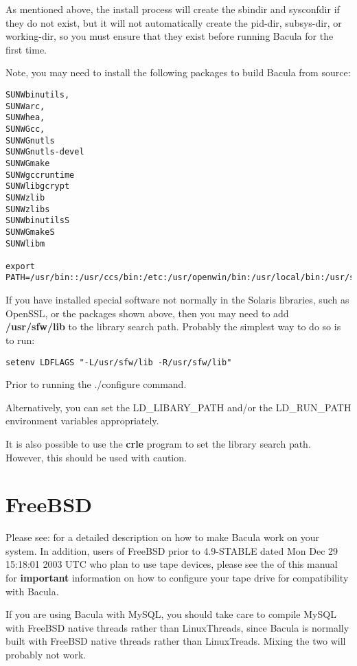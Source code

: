 As mentioned above, the install process will create the sbindir and sysconfdir
if they do not exist, but it will not automatically create the pid-dir,
subsys-dir, or working-dir, so you must ensure that they exist before running
Bacula for the first time.

Note, you may need to install the following packages to build Bacula
from source:
\footnotesize
\begin{verbatim}
SUNWbinutils,
SUNWarc,
SUNWhea,
SUNWGcc,
SUNWGnutls
SUNWGnutls-devel
SUNWGmake
SUNWgccruntime
SUNWlibgcrypt
SUNWzlib
SUNWzlibs
SUNWbinutilsS
SUNWGmakeS
SUNWlibm

export 
PATH=/usr/bin::/usr/ccs/bin:/etc:/usr/openwin/bin:/usr/local/bin:/usr/sfw/bin:/opt/sfw/bin:/usr/ucb:/usr/sbin
\end{verbatim}
\normalsize

If you have installed special software not normally in the Solaris
libraries, such as OpenSSL, or the packages shown above, then you may need
to add {\bf /usr/sfw/lib} to the library search path.  Probably the
simplest way to do so is to run:

\footnotesize
\begin{verbatim}
setenv LDFLAGS "-L/usr/sfw/lib -R/usr/sfw/lib"
\end{verbatim}
\normalsize

Prior to running the ./configure command.

Alternatively, you can set the LD\_LIBARY\_PATH and/or the LD\_RUN\_PATH
environment variables appropriately.

It is also possible to use the {\bf crle} program to set the library
search path.  However, this should be used with caution.

\section{FreeBSD}

Please see: 
 for a
detailed description on how to make Bacula work on your system. In addition,
users of FreeBSD prior to 4.9-STABLE dated Mon Dec 29 15:18:01 2003 UTC who
plan to use tape devices, please see the 
 of this manual for
{\bf important} information on how to configure your tape drive for
compatibility with Bacula. 

If you are using Bacula with MySQL, you should take care to compile MySQL with
FreeBSD native threads rather than LinuxThreads, since Bacula is normally built
with FreeBSD native threads rather than LinuxTreads. Mixing the two will
probably not work. 

